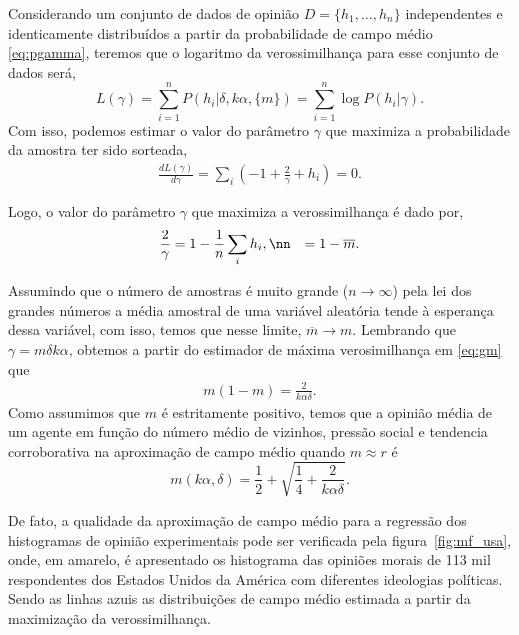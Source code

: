Considerando um conjunto de dados de opinião $D= \{h_1,\ldots,h_n\}$
independentes e identicamente distribuídos a partir da probabilidade de campo
médio \eqref{eq:pgamma}, teremos que o logaritmo da verossimilhança para
esse conjunto de dados será,
\begin{equation}
    L(\gamma) = \sum_{i=1}^n P(h_i|\delta, k \alpha,\{m\}) 
        = \sum_{i=1}^n \log P(h_i|\gamma).
\end{equation}
Com isso, podemos estimar o valor do parâmetro $\gamma$ que maximiza a
probabilidade da amostra ter sido sorteada,
\begin{align}
    \frac{d L(\gamma)}{d \gamma} = \sum_i ( -1 + \frac{2}{\gamma} + h_i ) = 0.
\end{align}

Logo, o valor do parâmetro $\gamma$ que maximiza a verossimilhança é dado por,
\begin{align}
    \frac{2}{\gamma} &= 1- \frac{1}{n}\sum_i h_i, \nn
                     &=  1 - \overline m.
    \label{eq:gm}
\end{align}

Assumindo que o número de amostras é muito grande ($n\rightarrow \infty$) pela
lei dos grandes números\cite{DeGroot1989,Wassermann2003} a média amostral de uma variável
aleatória tende à esperança dessa variável, com isso, temos que nesse limite,
$\overline m \rightarrow m $. Lembrando que $\gamma = m \delta k \alpha$,
obtemos a partir do estimador de máxima verosimilhança em \eqref{eq:gm} que
\begin{align}
    m(1-m) = \frac{2}{k\alpha\delta}.
\end{align}
Como assumimos que $m$ é estritamente positivo, temos que a opinião média de um
agente em função do número médio de vizinhos, pressão social e tendencia
corroborativa na aproximação de campo médio quando $m\approx r$ é 
\begin{equation}
    m(k\alpha,\delta) = \frac{1}{2} + \sqrt{\frac{1}{4} +\frac{2}{k\alpha\delta}}.
\end{equation}

De fato, a qualidade da aproximação de campo médio para a regressão
dos histogramas de opinião experimentais pode ser verificada pela
figura~\ref{fig:mf_usa}, onde, em amarelo, é apresentado os histograma das
opiniões morais de 113 mil respondentes dos Estados Unidos da América com
diferentes ideologias políticas. Sendo as linhas azuis as distribuições
de campo médio estimada a partir da maximização da verossimilhança.
 
